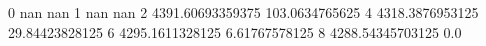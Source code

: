0 nan nan
1 nan nan
2 4391.60693359375 103.0634765625
4 4318.3876953125 29.84423828125
6 4295.1611328125 6.61767578125
8 4288.54345703125 0.0

